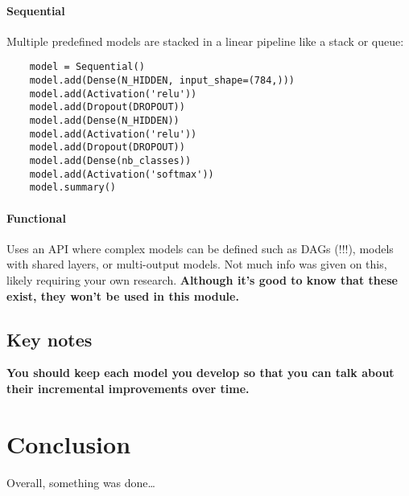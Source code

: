 \documentclass[12pt]{report}
\begin{document}
\subsubsection{Sequential}
Multiple predefined models are stacked in a linear pipeline like a stack or queue:

\begin{verbatim}
    model = Sequential()
    model.add(Dense(N_HIDDEN, input_shape=(784,)))
    model.add(Activation('relu'))
    model.add(Dropout(DROPOUT))
    model.add(Dense(N_HIDDEN))
    model.add(Activation('relu'))
    model.add(Dropout(DROPOUT))
    model.add(Dense(nb_classes))
    model.add(Activation('softmax'))
    model.summary()
\end{verbatim}

\subsubsection{Functional}
Uses an API where complex models can be defined such as DAGs (!!!), models with shared layers, 
or multi-output models. Not much info was given on this, likely requiring your own research.
\textbf{Although it's good to know that these exist, they won't be used in this module.}  


\section{Key notes}
\textbf{You should keep each model you develop so that you can talk about their incremental improvements over time.}

\chapter*{Conclusion}

Overall, something was done\dots

% 

\printbibliography
\end{document}
